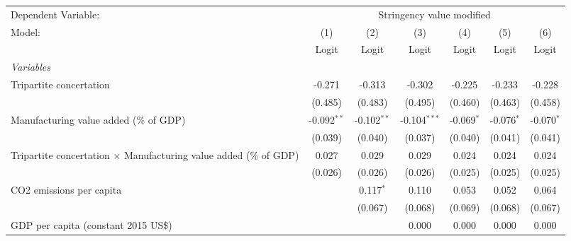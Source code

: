 
\begingroup
\centering
\begin{tabular}{lcccccc}
   \toprule
   Dependent Variable: & \multicolumn{6}{c}{Stringency value modified}\\
   Model:                                                                   & (1)           & (2)           & (3)            & (4)           & (5)           & (6)\\  
                                                                            &  Logit        & Logit         & Logit          & Logit         & Logit         & Logit\\  
   \midrule
   \emph{Variables}\\
   Tripartite concertation                                                  & -0.271        & -0.313        & -0.302         & -0.225        & -0.233        & -0.228\\   
                                                                            & (0.485)       & (0.483)       & (0.495)        & (0.460)       & (0.463)       & (0.458)\\   
   Manufacturing value added (\% of GDP)                                    & -0.092$^{**}$ & -0.102$^{**}$ & -0.104$^{***}$ & -0.069$^{*}$  & -0.076$^{*}$  & -0.070$^{*}$\\   
                                                                            & (0.039)       & (0.040)       & (0.037)        & (0.040)       & (0.041)       & (0.041)\\   
   Tripartite concertation $\times$ Manufacturing value added (\% of GDP)   & 0.027         & 0.029         & 0.029          & 0.024         & 0.024         & 0.024\\   
                                                                            & (0.026)       & (0.026)       & (0.026)        & (0.025)       & (0.025)       & (0.025)\\   
   CO2 emissions per capita                                                 &               & 0.117$^{*}$   & 0.110          & 0.053         & 0.052         & 0.064\\   
                                                                            &               & (0.067)       & (0.068)        & (0.069)       & (0.068)       & (0.067)\\   
   GDP per capita (constant 2015 US\$)                                      &               &               & 0.000          & 0.000         & 0.000         & 0.000\\   

\end{tabular}
